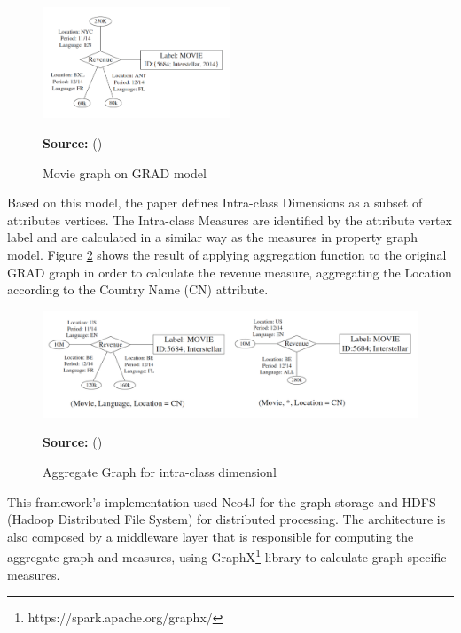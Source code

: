 \begin{figure}[!ht]
\centering
\caption{Movie graph on GRAD model}
\label{fig:figure23}
\includegraphics[width=0.5\textwidth]{images/grad_model.png}
\par\medskip\ABNTEXfontereduzida\selectfont\textbf{Source:} \citeauthor{ghrab2015framework} (\citeyear{ghrab2015framework}) \par\medskip
\end{figure}

Based on this model, the paper defines Intra-class Dimensions as a subset of attributes vertices. The Intra-class Measures are identified by the attribute vertex label and are calculated in a similar way as the measures in property graph model. Figure \ref{fig:figure24} shows the result of applying aggregation function to the original GRAD graph in order to calculate the revenue measure, aggregating the Location according to the Country Name (CN) attribute.

\begin{figure}[!ht]
\centering
\caption{Aggregate Graph for intra-class dimensionl}
\label{fig:figure24}
\includegraphics[width=1\textwidth]{images/intraclass_dimension.png}
\par\medskip\ABNTEXfontereduzida\selectfont\textbf{Source:} \citeauthor{ghrab2015framework} (\citeyear{ghrab2015framework}) \par\medskip
\end{figure}

This framework's implementation used Neo4J for the graph storage and HDFS  (Hadoop Distributed File System) for distributed processing. The architecture is also composed by a middleware layer that is responsible for computing the aggregate graph and measures, using GraphX\footnote{https://spark.apache.org/graphx/} library to calculate graph-specific measures.

